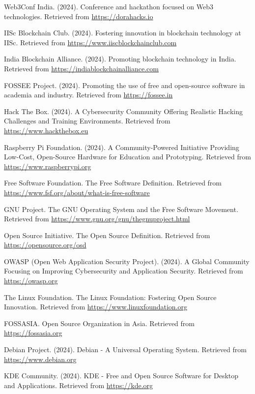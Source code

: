 \documentclass[12pt,a4paper]{article}
\begin{document}
\begin{thebibliography}{20}
Web3Conf India. (2024). Conference and hackathon focused on Web3 technologies. Retrieved from \url{https://dorahacks.io}

IISc Blockchain Club. (2024). Fostering innovation in blockchain technology at IISc. Retrieved from \url{https://www.iiscblockchainclub.com}

India Blockchain Alliance. (2024). Promoting blockchain technology in India. Retrieved from \url{https://indiablockchainalliance.com}

FOSSEE Project. (2024). Promoting the use of free and open-source software in academia and industry. Retrieved from \url{https://fossee.in}

 Hack The Box. (2024). A Cybersecurity Community Offering Realistic Hacking Challenges and Training Environments. Retrieved from \url{https://www.hackthebox.eu}

 Raspberry Pi Foundation. (2024). A Community-Powered Initiative Providing Low-Cost, Open-Source Hardware for Education and Prototyping. Retrieved from \url{https://www.raspberrypi.org}

Free Software Foundation. The Free Software Definition. Retrieved from \url{https://www.fsf.org/about/what-is-free-software}

GNU Project. The GNU Operating System and the Free Software Movement. Retrieved from \url{https://www.gnu.org/gnu/thegnuproject.html}

Open Source Initiative. The Open Source Definition. Retrieved from \url{https://opensource.org/osd}

 OWASP (Open Web Application Security Project). (2024). A Global Community Focusing on Improving Cybersecurity and Application Security. Retrieved from \url{https://owasp.org}

The Linux Foundation. The Linux Foundation: Fostering Open Source Innovation. Retrieved from \url{https://www.linuxfoundation.org}

FOSSASIA. Open Source Organization in Asia. Retrieved from \url{https://fossasia.org}

 Debian Project. (2024). Debian - A Universal Operating System. Retrieved from \url{https://www.debian.org}

 KDE Community. (2024). KDE - Free and Open Source Software for Desktop and Applications. Retrieved from \url{https://kde.org}


\end{thebibliography}
\end{document}
